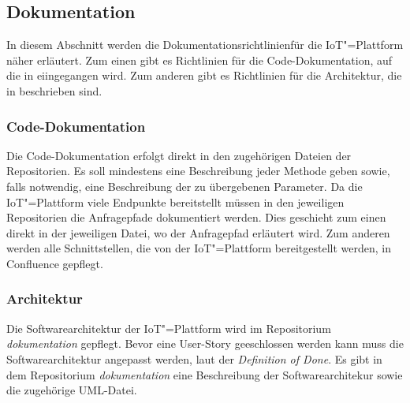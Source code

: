 \subsection{Dokumentation}
In diesem Abschnitt werden die Dokumentationsrichtlinienfür die IoT"=Plattform näher erläutert. Zum einen gibt es Richtlinien für die Code-Dokumentation, auf die in  eiingegangen wird. Zum anderen gibt es Richtlinien für die Architektur, die in  beschrieben sind.
\subsubsection{Code-Dokumentation}
\label{sec:iot:codedoku}
Die Code-Dokumentation erfolgt direkt in den zugehörigen Dateien der Repositorien. Es soll mindestens eine Beschreibung jeder Methode geben sowie, falls notwendig, eine Beschreibung der zu übergebenen Parameter. Da die IoT"=Plattform viele Endpunkte bereitstellt müssen in den jeweiligen Repositorien die Anfragepfade dokumentiert werden. Dies geschieht zum einen direkt in der jeweiligen Datei, wo der Anfragepfad erläutert wird. Zum anderen werden alle Schnittstellen, die von der IoT"=Plattform bereitgestellt werden, in Confluence gepflegt. 

\subsubsection{Architektur}
\label{sec:iot:archidoku}
Die Softwarearchitektur der IoT"=Plattform wird im Repositorium \textit{dokumentation} gepflegt. Bevor eine User-Story geeschlossen werden kann muss die Softwarearchitektur angepasst werden, laut der \textit{Definition of Done}. Es gibt in dem Repositorium \textit{dokumentation} eine Beschreibung der Softwarearchitekur sowie die zugehörige UML-Datei. 

